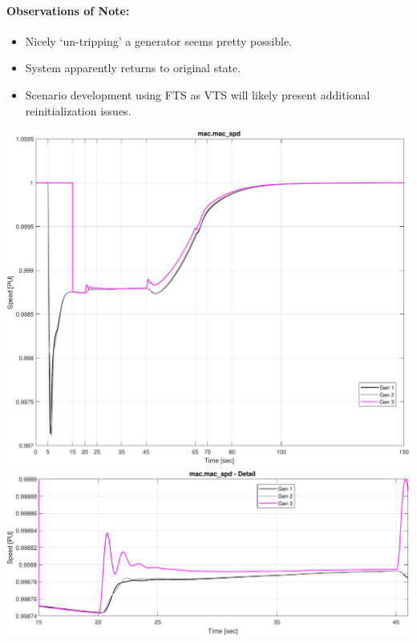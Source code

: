 \documentclass[12pt]{article}
\begin{document}
\paragraph{Observations of Note:}
\begin{itemize}
 em
\item Nicely `un-tripping' a generator seems pretty possible.
\item System apparently returns to original state.
\item Scenario development using FTS as VTS will likely present additional reinitialization issues.
\end{itemize}

\pagebreak
\includegraphics[width=\linewidth]{combinedSpeed}
\includegraphics[width=\linewidth]{combinedSpeedDetail}
\end{document}
